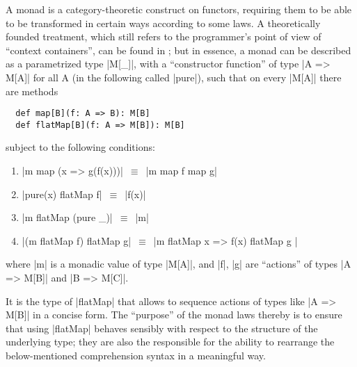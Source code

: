 A monad is a category-theoretic construct on functors, requiring them to be able to be transformed
in certain ways according to some laws. A theoretically founded treatment, which still refers to the
programmer's point of view of \enquote{context containers}, can be found in \cite{moggi1991:monads};
but in essence, a monad can be described as a parametrized type |M[_]|, with a \enquote{constructor
  function} of type |A => M[A]| for all A (in the following called |pure|), such that on every
|M[A]| there are methods
\begin{lstlisting}
  def map[B](f: A => B): M[B]
  def flatMap[B](f: A => M[B]): M[B]
\end{lstlisting}
subject to the following conditions:
\begin{enumerate}
\item |m map (x => g(f(x)))| \(\,\equiv\,\) |m map f map g|
\item |pure(x) flatMap f| \(\,\equiv\,\) |f(x)| 
\item |m flatMap (pure _)| \(\,\equiv\,\) |m|
\item |(m flatMap f) flatMap g| \(\,\equiv\,\) |m flatMap { x => f(x) flatMap g }|
\end{enumerate}
where |m| is a monadic value of type |M[A]|, and |f|, |g| are \enquote{actions} of types |A => M[B]|
and |B => M[C]|.

It is the type of |flatMap| that allows to sequence actions of types like |A => M[B]| in a concise
form. The \enquote{purpose} of the monad laws thereby is to ensure that using |flatMap| behaves
sensibly with respect to the structure of the underlying type; they are also the responsible for the
ability to rearrange the below-mentioned comprehension syntax in a meaningful way.

